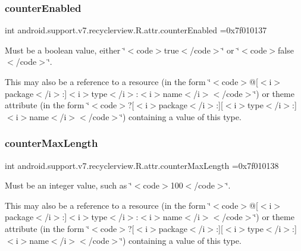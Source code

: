 \subsubsection{\texorpdfstring{counter\+Enabled}{counterEnabled}}
{\footnotesize\ttfamily int android.\+support.\+v7.\+recyclerview.\+R.\+attr.\+counter\+Enabled =0x7f010137\hspace{0.3cm}{\ttfamily [static]}}

Must be a boolean value, either \char`\"{}$<$code$>$true$<$/code$>$\char`\"{} or \char`\"{}$<$code$>$false$<$/code$>$\char`\"{}. 

This may also be a reference to a resource (in the form \char`\"{}$<$code$>$@\mbox{[}$<$i$>$package$<$/i$>$\+:\mbox{]}$<$i$>$type$<$/i$>$\+:$<$i$>$name$<$/i$>$$<$/code$>$\char`\"{}) or theme attribute (in the form \char`\"{}$<$code$>$?\mbox{[}$<$i$>$package$<$/i$>$\+:\mbox{]}\mbox{[}$<$i$>$type$<$/i$>$\+:\mbox{]}$<$i$>$name$<$/i$>$$<$/code$>$\char`\"{}) containing a value of this type. \mbox{\label{classandroid_1_1support_1_1v7_1_1recyclerview_1_1R_1_1attr_a934f94b6a4ddaae68294698ae735fddb}} 
\subsubsection{\texorpdfstring{counter\+Max\+Length}{counterMaxLength}}
{\footnotesize\ttfamily int android.\+support.\+v7.\+recyclerview.\+R.\+attr.\+counter\+Max\+Length =0x7f010138\hspace{0.3cm}{\ttfamily [static]}}

Must be an integer value, such as \char`\"{}$<$code$>$100$<$/code$>$\char`\"{}. 

This may also be a reference to a resource (in the form \char`\"{}$<$code$>$@\mbox{[}$<$i$>$package$<$/i$>$\+:\mbox{]}$<$i$>$type$<$/i$>$\+:$<$i$>$name$<$/i$>$$<$/code$>$\char`\"{}) or theme attribute (in the form \char`\"{}$<$code$>$?\mbox{[}$<$i$>$package$<$/i$>$\+:\mbox{]}\mbox{[}$<$i$>$type$<$/i$>$\+:\mbox{]}$<$i$>$name$<$/i$>$$<$/code$>$\char`\"{}) containing a value of this type. \mbox{\label{classandroid_1_1support_1_1v7_1_1recyclerview_1_1R_1_1attr_aaf538a761fbe44d69c7c5ff51c8a5dc2}} 

